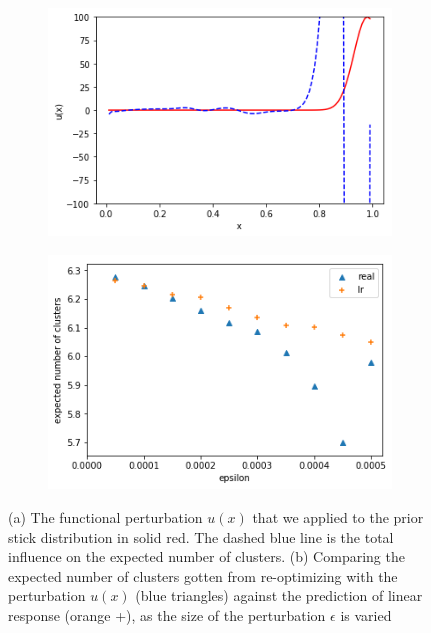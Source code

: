 \documentclass[a4paper]{article}
\begin{document}
\begin{figure}[h!]
	\centering
	\begin{subfigure}[t]{0.4\textwidth}
		\includegraphics[width = \textwidth]{./functional_sensitivity_figs/pert2.png}
		\subcaption{}
	\end{subfigure}
	\begin{subfigure}[t]{0.4\textwidth}
		\includegraphics[width = \textwidth]{./functional_sensitivity_figs/vary_epsilon_e_num_clust2.png}
		\subcaption{}
	\end{subfigure}
	\caption{(a) The functional perturbation $u(x)$ that we applied to the prior stick distribution in solid red. The dashed
	blue line is the total influence on the expected number of clusters. (b) Comparing the expected number of clusters gotten from
	re-optimizing with the perturbation $u(x)$ (blue triangles) against the prediction of linear response (orange +), as
	the size of the perturbation $\epsilon$ is varied}
	\label{fig:influence_on_num_clusters2}
\end{figure}
\end{document}

